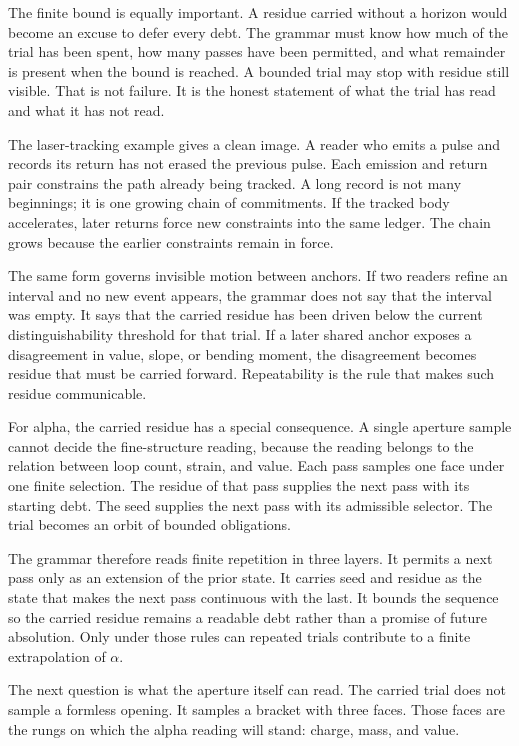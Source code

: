 The finite bound is equally important. A residue carried without a horizon
would become an excuse to defer every debt. The grammar must know how much
of the trial has been spent, how many passes have been permitted, and what
remainder is present when the bound is reached. A bounded trial may stop with
residue still visible. That is not failure. It is the honest statement of
what the trial has read and what it has not read.

The laser-tracking example gives a clean image. A reader who emits a pulse
and records its return has not erased the previous pulse. Each emission and
return pair constrains the path already being tracked. A long record is not
many beginnings; it is one growing chain of commitments. If the tracked body
accelerates, later returns force new constraints into the same ledger. The
chain grows because the earlier constraints remain in force.

The same form governs invisible motion between anchors. If two readers refine
an interval and no new event appears, the grammar does not say that the
interval was empty. It says that the carried residue has been driven below
the current distinguishability threshold for that trial. If a later shared
anchor exposes a disagreement in value, slope, or bending moment, the
disagreement becomes residue that must be carried forward. Repeatability is
the rule that makes such residue communicable.

For alpha, the carried residue has a special consequence. A single aperture
sample cannot decide the fine-structure reading, because the reading belongs
to the relation between loop count, strain, and value. Each pass samples one
face under one finite selection. The residue of that pass supplies the next
pass with its starting debt. The seed supplies the next pass with its
admissible selector. The trial becomes an orbit of bounded obligations.

The grammar therefore reads finite repetition in three layers. It permits a
next pass only as an extension of the prior state. It carries seed and residue
as the state that makes the next pass continuous with the last. It bounds the
sequence so the carried residue remains a readable debt rather than a promise
of future absolution. Only under those rules can repeated trials contribute
to a finite extrapolation of \(\alpha\).

The next question is what the aperture itself can read. The carried trial
does not sample a formless opening. It samples a bracket with three faces.
Those faces are the rungs on which the alpha reading will stand: charge,
mass, and value.

